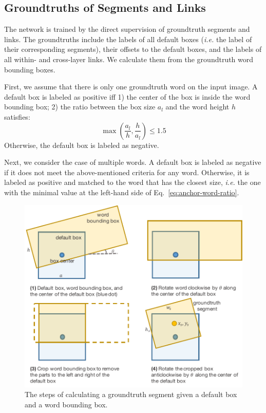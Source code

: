 \documentclass[10pt,twocolumn,letterpaper]{article}
\begin{document}
\subsection{Groundtruths of Segments and Links}

The network is trained by the direct supervision of groundtruth segments and links.
The groundtruths include the labels of all default boxes (\emph{i.e.} the label of their corresponding segments), their offsets to the default boxes, and the labels of all within- and cross-layer links.
We calculate them from the groundtruth word bounding boxes.

First, we assume that there is only one groundtruth word on the input image. A default box is labeled as positive iff 1) the center of the box is inside the word bounding box; 2) the ratio between the box size $a_l$ and the word height $h$ satisfies:
\begin{equation}
  \max (\frac{a_l}{h}, \frac{h}{a_l}) \leq 1.5
  \label{eq:anchor-word-ratio}
\end{equation}
Otherwise, the default box is labeled as negative.

Next, we consider the case of multiple words. A default box is labeled as negative if it does not meet the above-mentioned criteria for any word.
Otherwise, it is labeled as positive and matched to the word that has the closest size, \emph{i.e.} the one with the minimal value at the left-hand side of Eq.~\ref{eq:anchor-word-ratio}.

\begin{figure}[h]
  \centering
  \includegraphics[width=0.9\linewidth]{figures/gt-segment-new.pdf}
  \caption{The steps of calculating a groundtruth segment given a default box and a word bounding box.}
  \label{fig:gt-segment}
\end{figure}
\end{document}
